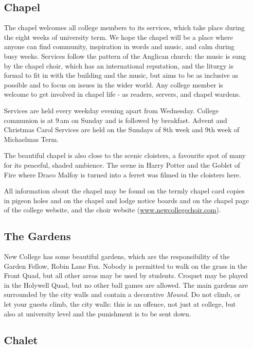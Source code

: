 \subsection{Chapel}
The chapel welcomes all college members to its services, which take place during the eight weeks of university term. We hope the chapel will be a place where anyone can find community, inspiration in words and music, and calm during busy weeks. Services follow the pattern of the Anglican church: the music is sung by the chapel choir, which has an international reputation, and the liturgy is formal to fit in with the building and the music, but aims to be as inclusive as possible and to focus on issues in the wider world. Any college member is welcome to get involved in chapel life - as readers, servers, and chapel wardens.

Services are held every weekday evening apart from Wednesday. College communion is at 9\,am on Sunday and is followed by breakfast. Advent and Christmas Carol Services are held on the Sundays of 8th week and 9th week of Michaelmas Term.

The beautiful chapel is also close to the scenic cloisters, a favourite spot of many for its peaceful, shaded ambience. The scene in Harry Potter and the Goblet of Fire where Draco Malfoy is turned into a ferret was filmed in the cloisters here. 

All information about the chapel may be found on the termly chapel card copies
in pigeon holes and on the chapel and lodge notice boards and on the chapel page
of the college website, and the choir website (\url{www.newcollegechoir.com}).

\subsection{The Gardens}
New College has some beautiful gardens, which are the responsibility of the Garden Fellow, Robin Lane Fox. Nobody is permitted to walk on the grass in the Front Quad, but all other areas may be used by students. Croquet may be played in the Holywell Quad, but no other ball games are allowed.
The main gardens are surrounded by the city walls and contain a decorative
\emph{Mound}. Do not climb, or let your guests climb, the city walls: this is an
offence, not just at college, but also at university level and the punishment is to be sent down.

\subsection{Chalet}

